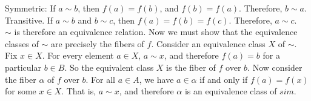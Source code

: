 \documentclass[12pt]{article}
\begin{document}
\begin{itemize}
Symmetric: If $a \sim b$, then $f(a) = f(b)$, and $f(b) = f(a)$. Therefore, $b \sim a$. \\
Transitive. If $a \sim b$ and $b \sim c$, then $f(a) = f(b) = f(c)$. Therefore, $a \sim c$. \\
$\sim$ is therefore an equivalence relation. Now we must show that the equivalence classes of $\sim$ are precisely the fibers of $f$. Consider an equivalence class $X$ of $\sim$. Fix $x \in X$. For every element $a \in X$, $a \sim x$, and therefore $f(a) = b$ for a particular $b \in B$. So the equivalent class $X$ is the fiber of $f$ over $b$. Now consider the fiber $\alpha$ of $f$ over $b$. For all $a \in A$, we have $a \in \alpha$ if and only if $f(a) = f(x)$ for some $x \in X$. That is, $a \sim x$, and therefore $\alpha$ is an equivalence class of $sim$.
\end{itemize}
\end{document}
